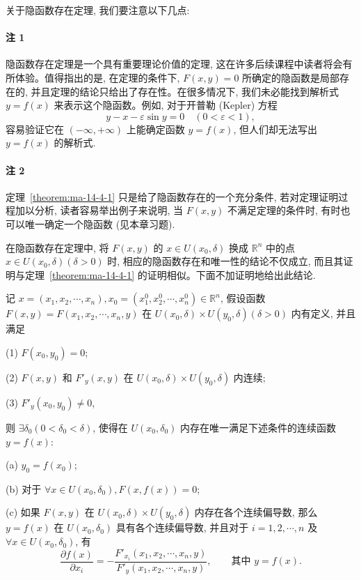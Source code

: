 关于隐函数存在定理, 我们要注意以下几点:

\paragraph*{注 1}
隐函数存在定理是一个具有重要理论价值的定理, 这在许多后续课程中读者将会有所体验。值得指出的是, 在定理的条件下, $F(x,y)=0$ 所确定的隐函数是局部存在的, 并且定理的结论只给出了存在性。在很多情况下, 我们未必能找到解析式 $y=f(x)$ 来表示这个隐函数。例如, 对于开普勒 (Kepler) 方程
\[
  y-x-\varepsilon\sin y=0\quad(0<\varepsilon<1),
\]
容易验证它在 $(-\infty,+\infty)$ 上能确定函数 $y=f(x)$, 但人们却无法写出 $y=f(x)$ 的解析式.

\paragraph*{注 2}
定理~\ref{theorem:ma-14-4-1} 只是给了隐函数存在的一个充分条件, 若对定理证明过程加以分析, 读者容易举出例子来说明, 当 $F(x,y)$ 不满足定理的条件时, 有时也可以唯一确定一个隐函数 (见本章习题).

在隐函数存在定理中, 将 $F(x,y)$ 的 $x\in U(x_0,\delta)$ 换成 $\mathbb R^n$ 中的点 $x\in U(x_0,\delta)(\delta>0)$ 时, 相应的隐函数存在和唯一性的结论不仅成立, 而且其证明与定理~\ref{theorem:ma-14-4-1} 的证明相似。下面不加证明地给出此结论.

\begin{theorem}[{隐函数存在定理}]\label{theorem:ma-14-4-2}
记 $x=(x_1,x_2,\cdots,x_n),x_0=(x_1^0,x_2^0,\cdots,x_n^0)\in\mathbb R^n$, 假设函数 $F(x,y)=F(x_1,x_2,\cdots,x_n,y)$ 在 $U(x_0,\delta)\times U(y_0,\delta)(\delta>0)$ 内有定义, 并且满足

(1) $F(x_0,y_0)=0$;

(2) $F(x,y)$ 和 $F'_y(x,y)$ 在 $U(x_0,\delta)\times U(y_0,\delta)$ 内连续;

(3) $F'_y(x_0,y_0)\ne0$,

则 $\exists\delta_0(0<\delta_0<\delta)$, 使得在 $U(x_0,\delta_0)$ 内存在唯一满足下述条件的连续函数 $y=f(x)$:

(a) $y_0=f(x_0)$;

(b) 对于 $\forall x\in U(x_0,\delta_0),F(x,f(x))=0$;

(c) 如果 $F(x,y)$ 在 $U(x_0,\delta)\times U(y_0,\delta)$ 内存在各个连续偏导数, 那么 $y=f(x)$ 在 $U(x_0,\delta_0)$ 具有各个连续偏导数, 并且对于 $i=1,2,\cdots,n$ 及 $\forall x\in U(x_0,\delta_0)$, 有
\[
  \frac{\partial f(x)}{\partial x_i}
  =-\frac{F'_{x_i}(x_1,x_2,\cdots,x_n,y)}
  {F'_y(x_1,x_2,\cdots,x_n,y)},\qquad
  \text{其中 }y=f(x).
\]
\end{theorem}


